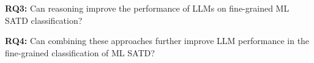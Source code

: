 \documentclass[acmsmall,screen,review,anonymous]{acmart}
\begin{document}
\textbf{RQ3:} Can reasoning improve the performance of LLMs on fine-grained ML SATD classification?








\textbf{RQ4:} Can combining these approaches further improve LLM performance in the fine-grained classification of ML SATD?






\end{document}
